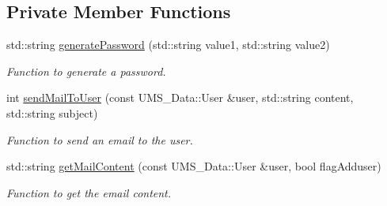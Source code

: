 \subsection*{Private Member Functions}
\begin{DoxyCompactItemize}
\item 
std::string \hyperlink{classUserServer_a61f17775588f641c30035349e5e8bfef}{generatePassword} (std::string value1, std::string value2)
\begin{DoxyCompactList}\small\item\em Function to generate a password. \item\end{DoxyCompactList}\item 
int \hyperlink{classUserServer_a6b7dc36a39371743c079635fdc1fcdbe}{sendMailToUser} (const UMS\_\-Data::User \&user, std::string content, std::string subject)
\begin{DoxyCompactList}\small\item\em Function to send an email to the user. \item\end{DoxyCompactList}\item 
std::string \hyperlink{classUserServer_a4896a5d7bd51b8ad24cf6864ba400487}{getMailContent} (const UMS\_\-Data::User \&user, bool flagAdduser)
\begin{DoxyCompactList}\small\item\em Function to get the email content. \item\end{DoxyCompactList}\end{DoxyCompactItemize}
